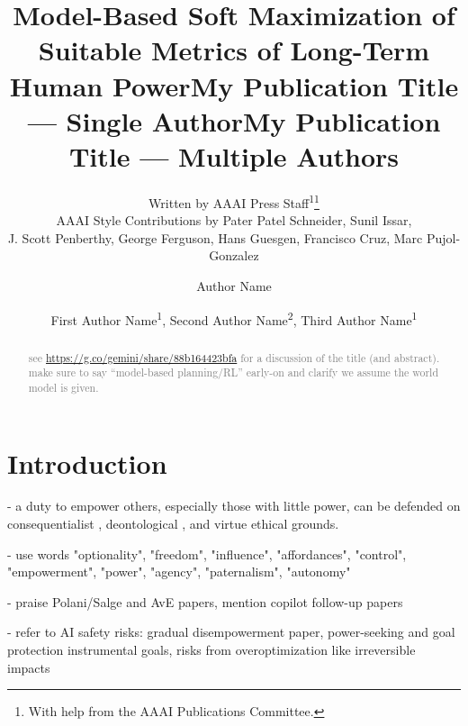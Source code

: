 \documentclass[letterpaper]{article} %
\title{Model-Based Soft Maximization of Suitable Metrics of Long-Term Human Power}
\author{
    Written by AAAI Press Staff\textsuperscript{\rm 1}\thanks{With help from the AAAI Publications Committee.}\\
    AAAI Style Contributions by Pater Patel Schneider,
    Sunil Issar,\\
    J. Scott Penberthy,
    George Ferguson,
    Hans Guesgen,
    Francisco Cruz\equalcontrib,
    Marc Pujol-Gonzalez\equalcontrib
}
\title{My Publication Title --- Single Author}
\author {
    Author Name
}
\title{My Publication Title --- Multiple Authors}
\author {
    First Author Name\textsuperscript{\rm 1},
    Second Author Name\textsuperscript{\rm 2},
    Third Author Name\textsuperscript{\rm 1}
}
\def\gray#1{\textcolor{gray}{#1}}
\begin{document}
\maketitle

\begin{abstract}
\gray{
see \url{https://g.co/gemini/share/88b164423bfa} for a discussion of the title (and abstract).
make sure to say ``model-based planning/RL'' early-on and clarify we assume the world model is given. 
}
\end{abstract}


\section{Introduction}

- a duty to empower others, especially those with little power, can be defended on consequentialist \cite{sen2014development}, deontological \cite{hill2002human}, and virtue ethical \cite{nussbaum2019aristotelian} grounds. %

- use words "optionality", "freedom", "influence", "affordances", "control", "empowerment", "power", "agency", "paternalism", "autonomy"

- praise Polani/Salge and AvE papers, mention copilot follow-up papers

- refer to AI safety risks: gradual disempowerment paper, power-seeking and goal protection instrumental goals, risks from overoptimization like irreversible impacts 
\end{document}
